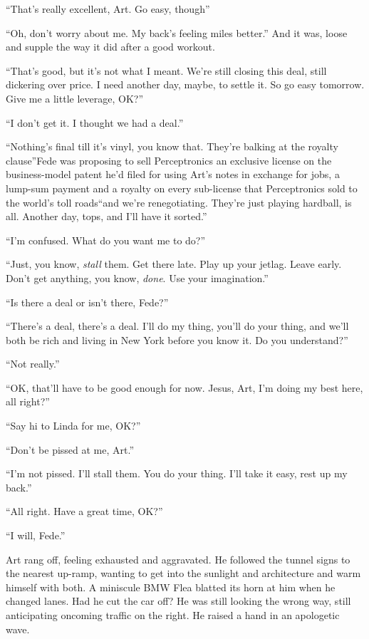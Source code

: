 “That’s really excellent, Art. Go easy, though{\dash}”

“Oh, don’t worry about me. My back’s feeling miles better.” And it
was, loose and supple the way it did after a good workout.

“That’s good, but it’s not what I meant. We’re still closing this
deal, still dickering over price. I need another day, maybe, to
settle it. So go easy tomorrow. Give me a little leverage, OK?”

“I don’t get it. I thought we had a deal.”

“Nothing’s final till it’s vinyl, you know that. They’re balking at
the royalty clause”{\dash}Fede was proposing to sell Perceptronics an
exclusive license on the business-model patent he’d filed for using
Art’s notes in exchange for jobs, a lump-sum payment and a royalty
on every sub-license that Perceptronics sold to the world’s toll
roads{\dash}“and we’re renegotiating. They’re just playing hardball, is
all. Another day, tops, and I’ll have it sorted.”

“I’m confused. What do you want me to do?”

“Just, you know, \emph{stall} them. Get there late. Play up your
jetlag. Leave early. Don’t get anything, you know, \emph{done}. Use
your imagination.”

“Is there a deal or isn’t there, Fede?”

“There’s a deal, there’s a deal. I’ll do my thing, you’ll do your
thing, and we’ll both be rich and living in New York before you
know it. Do you understand?”

“Not really.”

“OK, that’ll have to be good enough for now. Jesus, Art, I’m doing
my best here, all right?”

“Say hi to Linda for me, OK?”

“Don’t be pissed at me, Art.”

“I’m not pissed. I’ll stall them. You do your thing. I’ll take it
easy, rest up my back.”

“All right. Have a great time, OK?”

“I will, Fede.”

Art rang off, feeling exhausted and aggravated. He followed the
tunnel signs to the nearest up-ramp, wanting to get into the
sunlight and architecture and warm himself with both. A miniscule
BMW Flea blatted its horn at him when he changed lanes. Had he cut
the car off? He was still looking the wrong way, still anticipating
oncoming traffic on the right. He raised a hand in an apologetic
wave.

